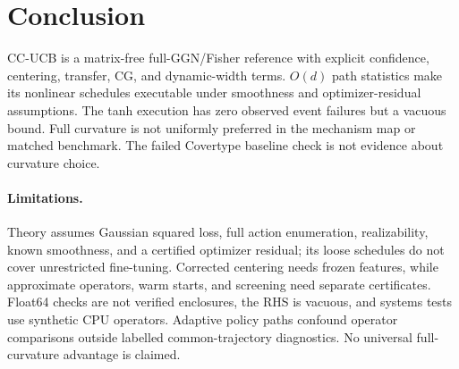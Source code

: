 \documentclass[twoside]{article}
\begin{document}
\section{Conclusion}\label{sec:conclusion}

CC-UCB is a matrix-free full-GGN/Fisher reference with explicit confidence,
centering, transfer, CG, and dynamic-width terms.  $O(d)$ path statistics make its
nonlinear schedules executable under smoothness and optimizer-residual assumptions.
The tanh execution has zero observed event failures but a vacuous bound.  Full
curvature is not uniformly preferred in the mechanism map or matched benchmark.
The failed Covertype baseline check is not evidence about curvature choice.

\paragraph{Limitations.}
Theory assumes Gaussian squared loss, full action enumeration, realizability,
known smoothness, and a certified optimizer residual; its loose schedules do not
cover unrestricted fine-tuning.  Corrected centering needs frozen features, while
approximate operators, warm starts, and screening need separate certificates.
Float64 checks are not verified enclosures, the RHS is vacuous, and systems tests
use synthetic CPU operators.  Adaptive policy paths confound operator comparisons
outside labelled common-trajectory diagnostics.  No universal full-curvature
advantage is claimed.

\FloatBarrier %
\clearpage



\end{document}
